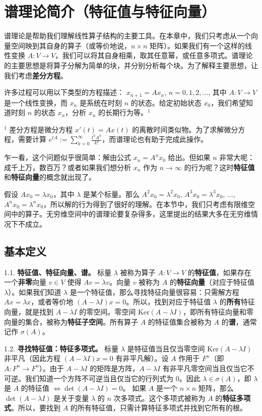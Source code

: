 \chapter{谱理论简介（特征值与特征向量）}

谱理论是帮助我们理解线性算子结构的主要工具。在本章中，我们只考虑从一个向量空间映到其自身的算子（或等价地说，$n \times n$ 矩阵）。如果我们有一个这样的线性变换 $A: V \to V$，我们可以将其自身相乘，取其任意幂，或任意多项式。谱理论的主要思想是将算子分解为简单的块，并分别分析每个块。为了解释主要思想，让我们考虑\textbf{差分方程}。

许多过程可以用以下类型的方程描述：
$x_{n+1} = Ax_n$, $n = 0, 1, 2, \dots$,
其中 $A: V \to V$ 是一个线性变换，而 $x_n$ 是系统在时刻 $n$ 的状态。给定初始状态 $x_0$，我们希望知道时刻 $n$ 的状态 $x_n$，分析 $x_n$ 的长期行为等。$^1$

$^1$ 差分方程是微分方程 $x'(t) = Ax(t)$ 的离散时间类似物。为了求解微分方程，需要计算 $e^{tA} := \sum_{k=0}^\infty \frac{t^k A^k}{k!}$，而谱理论也有助于完成此操作。


乍一看，这个问题似乎很简单：解由公式 $x_n = A^n x_0$ 给出。但如果 $n$ 非常大呢：成千上万，数百万？或者如果我们想分析 $x_n$ 作为 $n \to \infty$ 的行为呢？这时\textbf{特征值}和\textbf{特征向量}的概念就出现了。

假设 $Ax_0 = \lambda x_0$，其中 $\lambda$ 是某个标量。那么 $A^2 x_0 = \lambda^2 x_0$, $A^3 x_0 = \lambda^3 x_0$, $\dots$, $A^n x_0 = \lambda^n x_0$，所以解的行为得到了很好的理解。在本节中，我们只考虑有限维空间中的算子。无穷维空间中的谱理论要复杂得多，这里提出的结果大多在无穷维情况下不成立。

\section{基本定义}

    1.1. \textbf{特征值、特征向量、谱。} 标量 $\lambda$ 被称为算子 $A: V \to V$ 的\textbf{特征值}，如果存在一个\textbf{非零}向量 $v \in V$ 使得 $Av = \lambda v$。向量 $v$ 被称为 $A$ 的\textbf{特征向量}（对应于特征值 $\lambda$）。如果我们知道 $\lambda$ 是一个特征值，那么寻找特征向量很容易：只需解方程 $Ax = \lambda x$，或者等价地 $(A - \lambda I)x = 0$。所以，找到对应于特征值 $\lambda$ 的\textbf{所有}特征向量，就是找到 $A - \lambda I$ 的零空间。零空间 $\text{Ker}(A - \lambda I)$，即所有特征向量和零向量的集合，被称为\textbf{特征子空间}。所有算子 $A$ 的特征值集合被称为 $A$ 的\textbf{谱}，通常记作 $\sigma(A)$。

    1.2. \textbf{寻找特征值：特征多项式。} 标量 $\lambda$ 是特征值当且仅当零空间 $\text{Ker}(A - \lambda I)$ 非平凡（因此方程 $(A - \lambda I)x = 0$ 有非平凡解）。设 $A$ 作用于 $F^n$（即 $A: F^n \to F^n$）。由于 $A - \lambda I$ 的矩阵是方阵，$A - \lambda I$ 有非平凡零空间当且仅当它不可逆。我们知道一个方阵不可逆当且仅当它的行列式为 $0$。因此
    $\lambda \in \sigma(A)$，即 $\lambda$ 是 $A$ 的特征值 $\Leftrightarrow \det(A - \lambda I) = 0$。
    如果 $A$ 是一个 $n \times n$ 矩阵，那么 $\det(A - \lambda I)$ 是关于变量 $\lambda$ 的 $n$ 次多项式。这个多项式被称为 $A$ 的\textbf{特征多项式}。所以，要找到 $A$ 的所有特征值，只需计算特征多项式并找到它所有的根。





